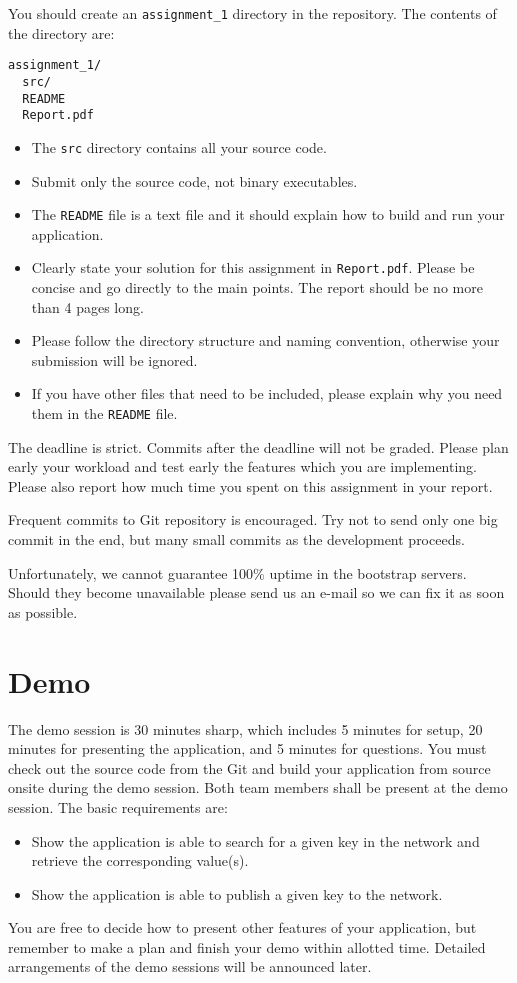 \documentclass[12pt, a4paper]{article}
\begin{document}
You should create an \texttt{assignment\_1} directory in the repository.
The contents of the directory are:
\begin{verbatim}
assignment_1/
  src/
  README
  Report.pdf
\end{verbatim}

\begin{itemize}
\item The \texttt{src} directory contains all your source code.
\item Submit only the source code, not binary executables.
\item The \texttt{README} file is a text file and it should explain how to build and run your application.
\item Clearly state your solution for this assignment in \texttt{Report.pdf}. Please be concise and go directly to the main points. The report should be no more than 4 pages long.
\item Please follow the directory structure and naming convention, otherwise your submission will be ignored.
\item If you have other files that need to be included, please explain why you need them in the \texttt{README} file.
\end{itemize}

The deadline is strict.
Commits after the deadline will not be graded.
Please plan early your workload and test early the features which you are implementing.
Please also report how much time you spent on this assignment in your report.

Frequent commits to Git repository is encouraged.
Try not to send only one big commit in the end, but many small commits as the development proceeds.

Unfortunately, we cannot guarantee 100\% uptime in the bootstrap servers.
Should they become unavailable please send us an e-mail so we can fix it as soon as possible.


\section{Demo}
The demo session is 30 minutes sharp, which includes 5 minutes for setup, 20 minutes for presenting the application, and 5 minutes for questions.
You must check out the source code from the Git and build your application from source onsite during the demo session.
Both team members shall be present at the demo session.
The basic requirements are:
\begin{itemize}
\item Show the application is able to search for a given key in the network and retrieve the corresponding value(s).
\item Show the application is able to publish a given key to the network.
\end{itemize}
You are free to decide how to present other features of your application, but remember to make a plan and finish your demo within allotted time.
Detailed arrangements of the demo sessions will be announced later.
\end{document}
